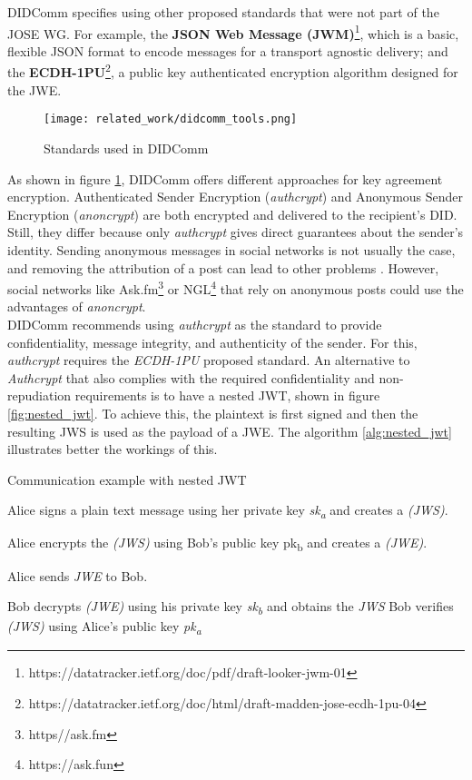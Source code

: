 DIDComm specifies using other proposed standards that were not part of the JOSE WG. For example, the \textbf{JSON Web Message (JWM)}\footnote{https://datatracker.ietf.org/doc/pdf/draft-looker-jwm-01}, which is a basic, flexible JSON format to encode messages for a transport agnostic delivery; and the \textbf{ECDH-1PU}\footnote{https://datatracker.ietf.org/doc/html/draft-madden-jose-ecdh-1pu-04}, a public key authenticated encryption algorithm designed for the JWE. 

\begin{figure}[H]
  \centering
  \texttt{[image: related\_work/didcomm\_tools.png]}
  \caption{Standards used in DIDComm}
  \label{fig:didcomm_tools}
\end{figure}

As shown in figure \ref{fig:didcomm_tools}, DIDComm offers different approaches for key agreement encryption. Authenticated Sender Encryption (\emph{authcrypt}) and Anonymous Sender Encryption (\emph{anoncrypt}) are both encrypted and delivered to the recipient's DID. Still, they differ because only \emph{authcrypt} gives direct guarantees about the sender's identity. Sending anonymous messages in social networks is not usually the case, and removing the attribution of a post can lead to other problems \cite{martin_2022}. However, social networks like Ask.fm\footnote{https//ask.fm} or NGL\footnote{https://ask.fun} that rely on anonymous posts could use the advantages of \emph{anoncrypt}. \\
DIDComm recommends using \emph{authcrypt} as the standard to provide confidentiality, message integrity, and authenticity of the sender. For this, \emph{authcrypt} requires the \emph{ECDH-1PU} proposed standard. An alternative to \emph{Authcrypt} that also complies with the required confidentiality and non-repudiation requirements is to have a nested JWT, shown in figure \ref{fig:nested_jwt}. To achieve this, the plaintext is first signed and then the resulting JWS is used as the payload of a JWE. The algorithm \ref{alg:nested_jwt} illustrates better the workings of this.

\begin{algorithm}[H]
  \caption{Communication example with nested JWT}
  \label{alg:nested_jwt}
    \begin{algorithmic}[1]
      \State Alice signs a plain text message using her private key \emph{sk\textsubscript{a}} and creates a \emph{(JWS)}.
  
      \State Alice encrypts the \emph{(JWS)} using Bob's public key pk\textsubscript{b} and creates a \emph{(JWE)}.
  
      \State Alice sends \emph{JWE} to Bob.
  
      \State Bob decrypts \emph{(JWE)} using his private key \emph{sk\textsubscript{b}} and obtains the \emph{JWS}
      \State Bob verifies \emph{(JWS)} using Alice's public key \emph{pk\textsubscript{a}}
  \end{algorithmic}
\end{algorithm}
  
